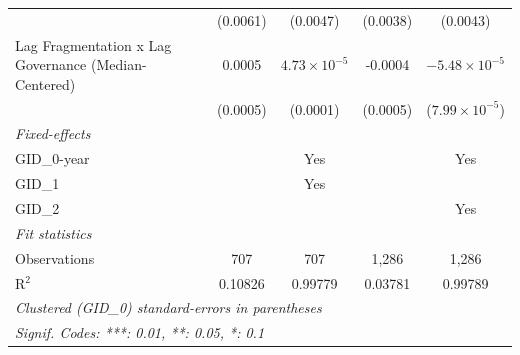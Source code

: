 \begin{table}[H]
\begin{tabular}{lcccc}
                                                           & (0.0061)               & (0.0047)                & (0.0038)               & (0.0043)\\   
      Lag Fragmentation x Lag Governance (Median-Centered) & 0.0005                 & $4.73\times 10^{-5}$    & -0.0004                & $-5.48\times 10^{-5}$\\    
                                                           & (0.0005)               & (0.0001)                & (0.0005)               & ($7.99\times 10^{-5}$)\\    
      \midrule
      \emph{Fixed-effects}\\
      GID\_0-year                                          &                        & Yes                     &                        & Yes\\  
      GID\_1                                               &                        & Yes                     &                        & \\  
      GID\_2                                               &                        &                         &                        & Yes\\  
      \midrule
      \emph{Fit statistics}\\
      Observations                                         & 707                    & 707                     & 1,286                  & 1,286\\  
      R$^2$                                                & 0.10826                & 0.99779                 & 0.03781                & 0.99789\\  
      \midrule \midrule
      \multicolumn{5}{l}{\emph{Clustered (GID\_0) standard-errors in parentheses}}\\
      \multicolumn{5}{l}{\emph{Signif. Codes: ***: 0.01, **: 0.05, *: 0.1}}\\
   \end{tabular}
\end{table}



